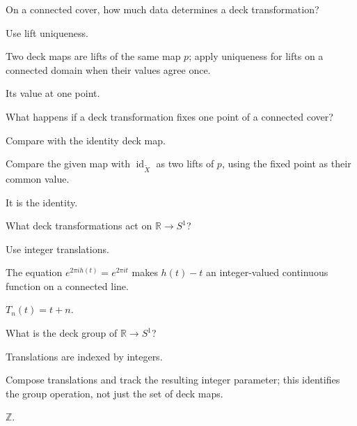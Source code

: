 \begin{exercise}\label{exr:viii12-04}
On a connected cover, how much data determines a deck transformation?
\end{exercise}
\begin{hint}
Use lift uniqueness.

Two deck maps are lifts of the same map \(p\); apply uniqueness for lifts on a connected domain when their values agree once.
\end{hint}
\begin{solution}
Its value at one point.
\end{solution}

\begin{exercise}\label{exr:viii12-05}
What happens if a deck transformation fixes one point of a connected cover?
\end{exercise}
\begin{hint}
Compare with the identity deck map.

Compare the given map with \(\operatorname{id}_{\widetilde X}\) as two lifts of \(p\), using the fixed point as their common value.
\end{hint}
\begin{solution}
It is the identity.
\end{solution}

\begin{exercise}\label{exr:viii12-06}
What deck transformations act on \(\mathbb R\to S^1\)?
\end{exercise}
\begin{hint}
Use integer translations.

The equation \(e^{2\pi i h(t)}=e^{2\pi it}\) makes \(h(t)-t\) an integer-valued continuous function on a connected line.
\end{hint}
\begin{solution}
\(T_n(t)=t+n\).
\end{solution}

\begin{exercise}\label{exr:viii12-07}
What is the deck group of \(\mathbb R\to S^1\)?
\end{exercise}
\begin{hint}
Translations are indexed by integers.

Compose translations and track the resulting integer parameter; this identifies the group operation, not just the set of deck maps.
\end{hint}
\begin{solution}
\(\mathbb Z\).
\end{solution}

